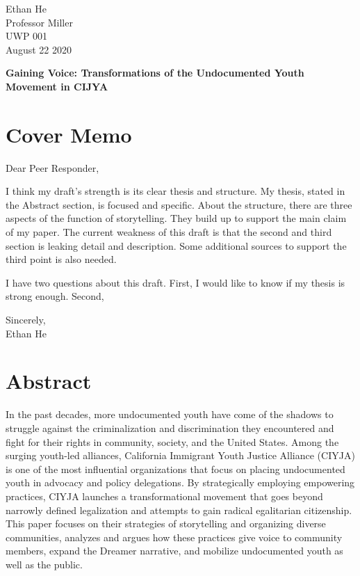 \documentclass[12pt]{article}
\begin{document}
\begin{flushleft}

Ethan He \\
Professor Miller \\
UWP 001 \\
August 22 2020 \\

\begin{center}
    \textbf{Gaining Voice: Transformations of the Undocumented Youth Movement in CIJYA}
\end{center}

\setlength{\parindent}{0.5in}

\section*{Cover Memo}

\noindent
Dear Peer Responder,

I think my draft's strength is its clear thesis and structure.
My thesis, stated in the Abstract section, is focused and specific.
About the structure, there are three aspects of the function of storytelling.
They build up to support the main claim of my paper.
The current weakness of this draft is that the second and third section is leaking detail and description.
Some additional sources to support the third point is also needed.

I have two questions about this draft.
First, I would like to know if my thesis is strong enough.
Second, 

\noindent
Sincerely, \\
\noindent
Ethan He

\section{Abstract}

In the past decades, more undocumented youth have come of the shadows to struggle against the criminalization and discrimination they encountered and fight for their rights in community, society, and the United States. 
Among the surging youth-led alliances, California Immigrant Youth Justice Alliance (CIYJA) is one of the most influential organizations that focus on placing undocumented youth in advocacy and policy delegations. 
By strategically employing empowering practices, CIYJA launches a transformational movement that goes beyond narrowly defined legalization and attempts to gain radical egalitarian citizenship.
This paper focuses on their strategies of storytelling and organizing diverse communities, analyzes and argues how these practices give voice to community members, expand the Dreamer narrative, and mobilize undocumented youth as well as the public.


\end{flushleft}
\end{document}
